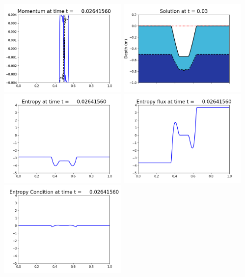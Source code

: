 \documentclass[11pt]{article}
\begin{document}
\vskip 10pt 
\includegraphics[width=0.475\textwidth]{frame0076fig1003.png}
\includegraphics[width=0.475\textwidth]{frame0076fig1006.png}
\vskip 10pt 
\includegraphics[width=0.475\textwidth]{frame0076fig1007.png}
\includegraphics[width=0.475\textwidth]{frame0076fig1008.png}
\vskip 10pt 
\includegraphics[width=0.475\textwidth]{frame0076fig1009.png}
\end{document}
